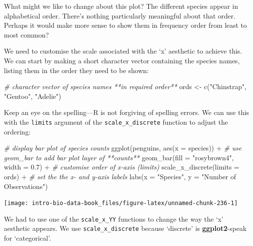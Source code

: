 \documentclass[
]{book}
\newenvironment{Shaded}{\begin{snugshade}}{\end{snugshade}}
\newcommand{\AttributeTok}[1]{\textcolor[rgb]{0.77,0.63,0.00}{#1}}
\newcommand{\CommentTok}[1]{\textcolor[rgb]{0.56,0.35,0.01}{\textit{#1}}}
\newcommand{\FloatTok}[1]{\textcolor[rgb]{0.00,0.00,0.81}{#1}}
\newcommand{\FunctionTok}[1]{\textcolor[rgb]{0.00,0.00,0.00}{#1}}
\newcommand{\NormalTok}[1]{#1}
\newcommand{\OtherTok}[1]{\textcolor[rgb]{0.56,0.35,0.01}{#1}}
\newcommand{\SpecialCharTok}[1]{\textcolor[rgb]{0.00,0.00,0.00}{#1}}
\newcommand{\StringTok}[1]{\textcolor[rgb]{0.31,0.60,0.02}{#1}}
\begin{document}
What might we like to change about this plot? The different species appear in alphabetical order. There's nothing particularly meaningful about that order. Perhaps it would make more sense to show them in frequency order from least to most common?

We need to customise the scale associated with the `x' aesthetic to achieve this. We can start by making a short character vector containing the species names, listing them in the order they need to be shown:

\begin{Shaded}
\begin{Highlighting}[]
\CommentTok{\# character vector of species names **in required order**}
\NormalTok{ords }\OtherTok{\textless{}{-}} \FunctionTok{c}\NormalTok{(}\StringTok{"Chinstrap"}\NormalTok{, }\StringTok{"Gentoo"}\NormalTok{, }\StringTok{"Adelie"}\NormalTok{)}
\end{Highlighting}
\end{Shaded}

Keep an eye on the spelling---R is not forgiving of spelling errors. We can use this with the \texttt{limits} argument of the \texttt{scale\_x\_discrete} function to adjust the ordering:

\begin{Shaded}
\begin{Highlighting}[]
\CommentTok{\# display bar plot of species counts}
\FunctionTok{ggplot}\NormalTok{(penguins, }\FunctionTok{aes}\NormalTok{(}\AttributeTok{x =}\NormalTok{ species)) }\SpecialCharTok{+} 
  \CommentTok{\# use geom\_bar to add bar plot layer of **counts**}
  \FunctionTok{geom\_bar}\NormalTok{(}\AttributeTok{fill =} \StringTok{"rosybrown4"}\NormalTok{, }\AttributeTok{width =} \FloatTok{0.7}\NormalTok{) }\SpecialCharTok{+} 
  \CommentTok{\# customise order of x{-}axis (limits)}
  \FunctionTok{scale\_x\_discrete}\NormalTok{(}\AttributeTok{limits =}\NormalTok{ ords) }\SpecialCharTok{+}
  \CommentTok{\# set the the x{-} and y{-}axis labels}
  \FunctionTok{labs}\NormalTok{(}\AttributeTok{x =} \StringTok{"Species"}\NormalTok{, }\AttributeTok{y =} \StringTok{"Number of Observations"}\NormalTok{)}
\end{Highlighting}
\end{Shaded}

\begin{center}\texttt{[image: intro-bio-data-book\_files/figure-latex/unnamed-chunk-236-1]} \end{center}

We had to use one of the \texttt{scale\_x\_YY} functions to change the way the `x' aesthetic appears. We use \texttt{scale\_x\_discrete} because `discrete' is \textbf{ggplot2}-speak for `categorical'.
\end{document}
